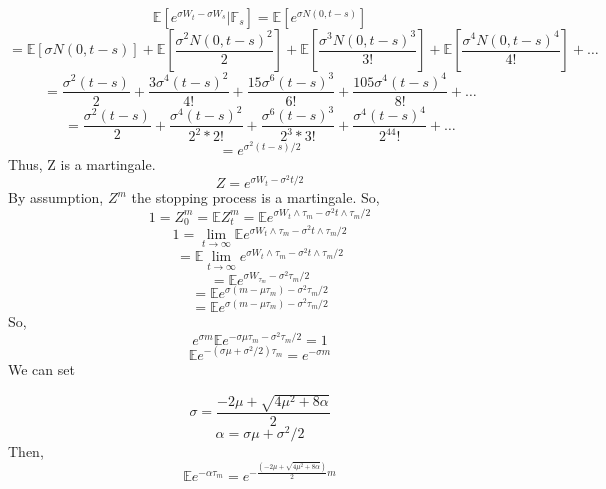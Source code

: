 \documentclass[a4paper,11pt]{article}
\begin{document}
\begin{enumerate}
\[\mathbb{E}[e^{\sigma W_t-\sigma W_s } |\mathbb{F}_s]=\mathbb{E}[e^{\sigma N(0,t-s)}]\]
\[=\mathbb{E}[\sigma N(0,t-s)]+\mathbb{E}[\frac{\sigma^2 N(0,t-s)^2}{2}]+ \mathbb{E}[\frac{\sigma^3 N(0,t-s)^3}{3!}]+ \mathbb{E}[\frac{\sigma^4 N(0,t-s)^4}{4!}]+\ldots\]
\[=\frac{\sigma^2 (t-s)}{2}+\frac{3\sigma^4 (t-s)^2}{4!}+ \frac{15\sigma^6 (t-s)^3}{6!}+ \frac{105 \sigma^4 (t-s)^4}{8!}+\ldots\]
\[=\frac{\sigma^2 (t-s)}{2}+\frac{\sigma^4 (t-s)^2}{2^2*2!}+ \frac{\sigma^6 (t-s)^3}{2^3*3!}+ \frac{ \sigma^4 (t-s)^4}{2^44!}+\ldots\]
\[= e^{\sigma^2 (t-s)/2 } \]
Thus, Z is a martingale.
\[Z = e^{\sigma W_t - \sigma^2 t/2}\]
By assumption, $Z^m$ the stopping process is a martingale.
So,
\[1=Z_0^m=\mathbb{E}Z_t^m=\mathbb{E}e^{\sigma W_t \wedge\tau_m - \sigma^2 t\wedge \tau_m/2}\]
\[1= \lim_{t\to \infty}\mathbb{E}e^{\sigma W_t \wedge\tau_m - \sigma^2 t\wedge \tau_m/2}\]
\[ = \mathbb{E}\lim_{t\to \infty}e^{\sigma W_t \wedge\tau_m - \sigma^2 t\wedge \tau_m/2}\]
\[=\mathbb{E}e^{\sigma W_{\tau_m} - \sigma^2  \tau_m/2}\]
\[=\mathbb{E}e^{\sigma (m-\mu \tau_m) - \sigma^2  \tau_m/2}\]
\[=\mathbb{E}e^{\sigma (m-\mu \tau_m) - \sigma^2  \tau_m/2}\]
So,
\[e^{\sigma m}\mathbb{E}e^{-\sigma\mu \tau_m - \sigma^2  \tau_m/2}=1\]
\[\mathbb{E}e^{-(\sigma\mu + \sigma^2/2)\tau_m }=e^{-\sigma m}\]
We can set

\[\sigma = \frac{-2\mu + \sqrt{4\mu^2+8\alpha}}{2}\]
\[\alpha =\sigma\mu + \sigma^2/2\]
Then,
\[\mathbb{E}e^{-\alpha \tau_m }=e^{-\frac{(-2\mu + \sqrt{4\mu^2+8\alpha})}{2} m}\]
\end{enumerate}  
\end{document}
